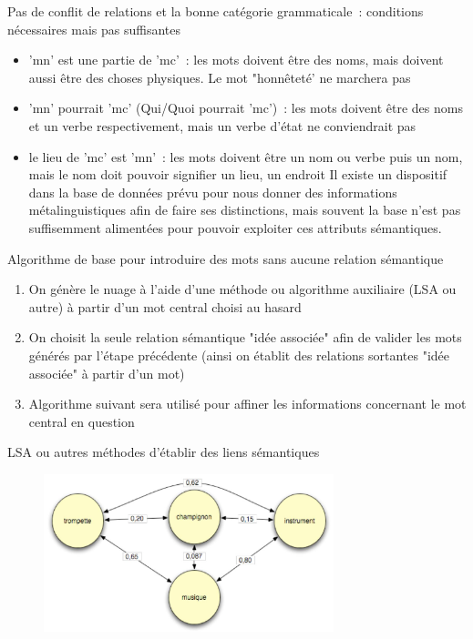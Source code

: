 \documentclass{beamer}
\begin{document}
\begin{frame}
  Pas de conflit de relations et la bonne catégorie grammaticale~: conditions nécessaires mais pas suffisantes 
  \begin{itemize}
  \item 'mn' est une partie de 'mc'~: les mots doivent être des noms, mais doivent aussi être des choses physiques. Le mot "honnêteté' ne marchera pas
  \item 'mn' pourrait 'mc' (Qui/Quoi pourrait 'mc')~: les mots doivent être des noms et un verbe respectivement, mais un verbe d'état ne conviendrait pas
  \item le lieu de 'mc' est 'mn'~: les mots doivent être un nom ou verbe puis un nom, mais le nom doit pouvoir signifier un lieu, un endroit
Il existe un dispositif dans la base de données prévu pour nous donner des informations métalinguistiques afin de faire ses distinctions, mais souvent la base n'est pas suffisemment alimentées pour pouvoir exploiter ces attributs sémantiques.
  \end{itemize} 
\end{frame}


\begin{frame}
  Algorithme de base pour introduire des mots sans aucune relation sémantique 
  \begin{enumerate}
  \item On génère le nuage à l'aide d'une méthode ou algorithme auxiliaire (LSA ou autre) à partir d'un mot central choisi au hasard
  \item On choisit la seule relation sémantique "idée associée" afin de valider les mots générés par l'étape précédente (ainsi on établit des relations sortantes "idée associée" à partir d'un mot)
  \item Algorithme suivant sera utilisé pour affiner les informations concernant le mot central en question
  \end{enumerate} 
\end{frame}


\begin{frame}
LSA ou autres méthodes d'établir des liens sémantiques
\begin{figure}
 \begin{minipage}{\textwidth}
\centering 
       \includegraphics[width=0.75\textwidth]{img/lsa.jpeg}
  \end{minipage}
\end{figure}
\end{frame}
\end{document}
